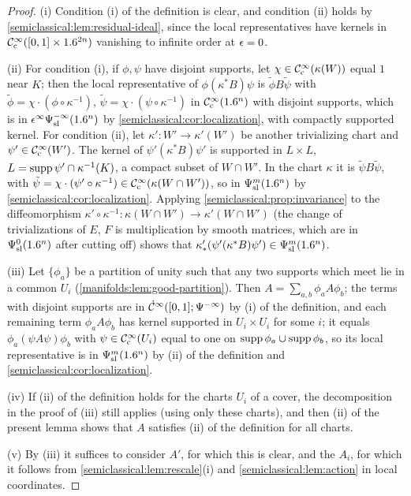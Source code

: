 \begin{proof}
  (i) Condition (i) of the definition is clear, and condition (ii) holds by
  \cref{semiclassical:lem:residual-ideal}, since the local representatives
  have kernels in $\mathcal{C}^\infty_{\mathrm{c}}([0,1]\times1.6^{2n})$ vanishing to infinite order at $\epsilon=0$.

  (ii) For condition (i), if $\phi,\psi$ have disjoint supports, let
  $\chi\in\mathcal{C}^\infty_{\mathrm{c}}(\kappa(W))$ equal $1$ near $K$; then the local representative of
  $\phi(\kappa^*B)\psi$ is $\tilde\phi B\tilde\psi$ with
  $\tilde\phi=\chi\cdot(\phi\circ\kappa^{-1})$, $\tilde\psi=\chi\cdot(\psi\circ\kappa^{-1})$ in
  $\mathcal{C}^\infty_{\mathrm{c}}(1.6^n)$ with disjoint supports, which is in $\epsilon^\infty\Psi^{-\infty}_{\mathrm{sl}}(1.6^n)$
  by \cref{semiclassical:cor:localization}, with compactly supported kernel. For
  condition (ii), let $\kappa':W'\to\kappa'(W')$ be another trivializing chart and
  $\psi'\in\mathcal{C}^\infty_{\mathrm{c}}(W')$. The kernel of $\psi'(\kappa^*B)\psi'$ is supported in
  $L\times L$, $L=\operatorname{supp}\psi'\cap\kappa^{-1}(K)$, a compact subset of $W\cap W'$. In the
  chart $\kappa$ it is $\tilde\psi B\tilde\psi$, with
  $\tilde\psi=\chi\cdot(\psi'\circ\kappa^{-1})\in\mathcal{C}^\infty_{\mathrm{c}}(\kappa(W\cap W'))$, so in
  $\Psi^{m}_{\mathrm{sl}}(1.6^n)$ by \cref{semiclassical:cor:localization}. Applying
  \cref{semiclassical:prop:invariance} to the diffeomorphism
  $\kappa'\circ\kappa^{-1}:\kappa(W\cap W')\to\kappa'(W\cap W')$ (the change of
  trivializations of $E$, $F$ is multiplication by smooth matrices, which are in
  $\Psi^{0}_{\mathrm{sl}}(1.6^n)$ after cutting off) shows that
  $\kappa'_*(\psi'(\kappa^*B)\psi')\in\Psi^{m}_{\mathrm{sl}}(1.6^n)$.

  (iii) Let $\{\phi_a\}$ be a partition of unity such that any two supports which meet
  lie in a common $U_i$ (\cref{manifolds:lem:good-partition}). Then
  $A=\sum_{a,b}\phi_aA\phi_b$; the terms with disjoint supports are in
  $\dot{\mathcal{C}}^\infty([0,1];\Psi^{-\infty})$ by (i) of the definition, and each remaining term
  $\phi_aA\phi_b$ has kernel supported in $U_i\times U_i$ for some $i$; it equals
  $\phi_a(\psi A\psi)\phi_b$ with $\psi\in\mathcal{C}^\infty_{\mathrm{c}}(U_i)$ equal to one on
  $\operatorname{supp}\phi_a\cup\operatorname{supp}\phi_b$, so its local representative is in $\Psi^{m}_{\mathrm{sl}}(1.6^n)$ by
  (ii) of the definition and \cref{semiclassical:cor:localization}.

  (iv) If (ii) of the definition holds for the charts $U_i$ of a cover, the
  decomposition in the proof of (iii) still applies (using only these charts),
  and then (ii) of the present lemma shows that $A$ satisfies (ii) of the
  definition for all charts.

  (v) By (iii) it suffices to consider $A'$, for which this is clear, and the
  $A_i$, for which it follows from \cref{semiclassical:lem:rescale}(i) and
  \cref{semiclassical:lem:action} in local coordinates.
\end{proof}

